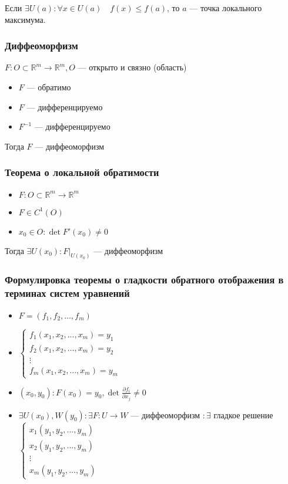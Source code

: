 \documentclass{article}
\begin{document}
Если $\exists U(a): \forall x \in U(a) \quad f(x) \le f(a)$, то $a$ --- точка локального максимума.

\subsubsection{Диффеоморфизм}
$F: O \subset \mathbb{R}^m \rightarrow \mathbb{R}^m, O$ --- открыто и связно (область)
\begin{itemize}
    \item $F$ --- обратимо
    \item $F$ --- дифференцируемо
    \item $F^{-1}$ --- дифференцируемо
\end{itemize}

Тогда $F$ --- диффеоморфизм

\subsubsection{Теорема о локальной обратимости}

\begin{itemize}
    \item $F: O \subset \mathbb{R}^m \rightarrow \mathbb{R}^m$
    \item $F \in C^1(O)$
    \item $x_0 \in O: \det F'(x_0) \neq 0$
\end{itemize}

Тогда $\exists U(x_0): F|_{U(x_0)}$ --- диффеоморфизм

\subsubsection{Формулировка теоремы о гладкости обратного отображения в терминах систем уравнений}

\begin{itemize}
    \item $F = (f_1, f_2, \ldots, f_m)$
    \item $\begin{cases}
        f_1(x_1, x_2, \ldots, x_m) = y_1\\
        f_2(x_1, x_2, \ldots, x_m) = y_2\\
        \vdots\\
        f_m(x_1, x_2, \ldots, x_m) = y_m
    \end{cases}$
    \item $(x_0, y_0): F(x_0) = y_0, \det \frac{\partial f_i}{\partial x_j} \neq 0$
    \item $\exists U(x_0), W(y_0): \exists F: U \rightarrow W$ --- диффеоморфизм $: \exists $ гладкое решение $ \begin{cases}
        x_1(y_1, y_2, \ldots, y_m)\\
        x_2(y_1, y_2, \ldots, y_m)\\
        \vdots\\
        x_m(y_1, y_2, \ldots, y_m)
    \end{cases}$
\end{itemize}
\end{document}
